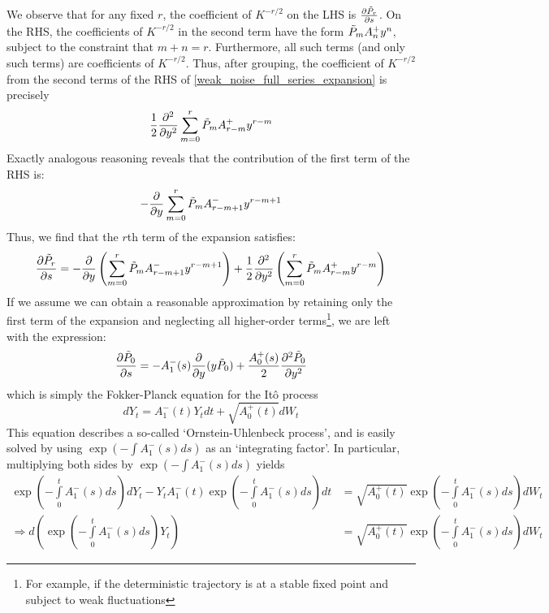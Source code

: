 We observe that for any fixed $r$, the coefficient of $K^{-r/2}$ on the LHS is $\frac{\partial \Tilde{P}_r}{\partial s}$. On the RHS, the coefficients of $K^{-r/2}$ in the second term have the form $\Tilde{P}_{m}A^+_{n}y^n$, subject to the constraint that $m+n=r$. Furthermore, all such terms (and only such terms) are coefficients of $K^{-r/2}$. Thus, after grouping, the coefficient of $K^{-r/2}$ from the second terms of the RHS of \eqref{weak_noise_full_series_expansion} is precisely
\begin{equation*}
\frac{1}{2}\frac{\partial^2}{\partial y^2}\sum\limits_{m=0}^{r}\Tilde{P}_{m}A^+_{r-m}y^{r-m}
\end{equation*}
Exactly analogous reasoning reveals that the contribution of the first term of the RHS is:
\begin{equation*}
-\frac{\partial}{\partial y}\sum\limits_{m=0}^{r}\Tilde{P}_{m}A^-_{r-m+1}y^{r-m+1}
\end{equation*}
Thus, we find that the $r$th term of the expansion satisfies:
\begin{equation}
\label{weak_noise_expansion_each_term}
\frac{\partial \Tilde{P}_r}{\partial s} = -\frac{\partial}{\partial y}\left(\sum\limits_{m=0}^{r}\Tilde{P}_{m}A^-_{r-m+1}y^{r-m+1}\right) + \frac{1}{2}\frac{\partial^2}{\partial y^2}\left(\sum\limits_{m=0}^{r}\Tilde{P}_{m}A^+_{r-m}y^{r-m}\right)
\end{equation}
If we assume we can obtain a reasonable approximation by retaining only the first term of the expansion and neglecting all higher-order terms\footnote{For example, if the deterministic trajectory is at a stable fixed point and subject to weak fluctuations}, we are left with the expression:
\begin{equation}
\label{1D_WNA}
\frac{\partial \Tilde{P}_0}{\partial s} = -A^-_1(s)\frac{\partial}{\partial y}(y\Tilde{P}_0) + \frac{A^+_{0}(s)}{2}\frac{\partial^2 \Tilde{P}_{0}}{\partial y^2}
\end{equation}
which is simply the Fokker-Planck equation for the It\^{o} process
\begin{equation*}
dY_t = A^-_1(t)Y_tdt + \sqrt{A^+_0(t)}dW_t
\end{equation*}
This equation describes a so-called `Ornstein-Uhlenbeck process', and is easily solved by using $\exp(-\int A^-_1(s)ds)$ as an `integrating factor'. In particular, multiplying both sides by $\exp(-\int A^-_1(s)ds)$ yields
\begin{align*}
\exp\left(-{\int\limits_{0}^{t}A^-_1(s)ds}\right)dY_t - Y_tA^-_1(t)\exp\left(-{\int\limits_{0}^{t}A^-_1(s)ds}\right)dt &= \sqrt{A^+_0(t)}\exp\left(-{\int\limits_{0}^{t}A^-_1(s)ds}\right)dW_t\\
\Rightarrow d\left(\exp\left(-{\int\limits_{0}^{t}A^-_1(s)ds}\right)Y_t\right) &= \sqrt{A^+_0(t)}\exp\left(-{\int\limits_{0}^{t}A^-_1(s)ds}\right)dW_t
\end{align*}
